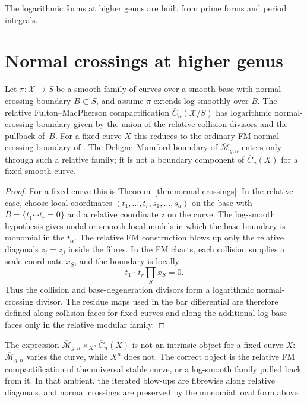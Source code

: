 The logarithmic forms at higher genus are built from prime forms and period integrals.

\section{Normal crossings at higher genus}
\label{sec:normal-crossings-higher-genus}

\begin{theorem}\label{thm:normal-crossings-preservation}
Let $\pi\colon \mathcal X\to S$ be a smooth family of curves over a
smooth base with normal-crossing boundary $B\subset S$, and assume
$\pi$ extends log-smoothly over $B$. The relative
Fulton--MacPherson compactification
$\overline{C}_n(\mathcal X/S)$ has logarithmic normal-crossing boundary
given by the union of the relative collision divisors and the pullback
of~$B$. For a fixed curve $X$ this reduces to the ordinary FM
normal-crossing boundary of \cite{FM94}. The Deligne--Mumford boundary
of $\overline{\mathcal M}_{g,n}$ enters only through such a relative
family; it is not a boundary component of $\overline C_n(X)$ for a
fixed smooth curve.
\end{theorem}

\begin{proof}
For a fixed curve this is Theorem~\ref{thm:normal-crossings}. In the
relative case, choose local coordinates
$(t_1,\ldots,t_r,s_1,\ldots,s_a)$ on the base with
$B=\{t_1\cdots t_r=0\}$ and a relative coordinate $z$ on the curve.
The log-smooth hypothesis gives nodal or smooth local models in which
the base boundary is monomial in the $t_\alpha$. The relative FM
construction blows up only the relative diagonals
$z_i=z_j$ inside the fibres. In the FM charts, each collision supplies a
scale coordinate $x_S$, and the boundary is locally
\[
t_1\cdots t_r\prod_S x_S=0.
\]
Thus the collision and base-degeneration divisors form a logarithmic
normal-crossing divisor. The residue maps used in the bar differential
are therefore defined along collision faces for fixed curves and along
the additional log base faces only in the relative modular family.
\end{proof}

\begin{remark}\label{rem:iterated-blowup}
The expression
$\overline{\mathcal M}_{g,n}\times_{X^n}\overline C_n(X)$ is not an
intrinsic object for a fixed curve $X$: $\overline{\mathcal M}_{g,n}$
varies the curve, while $X^n$ does not. The correct object is the
relative FM compactification of the universal stable curve, or a
log-smooth family pulled back from it. In that ambient, the iterated
blow-ups are fibrewise along relative diagonals, and normal crossings
are preserved by the monomial local form above.
\end{remark}
